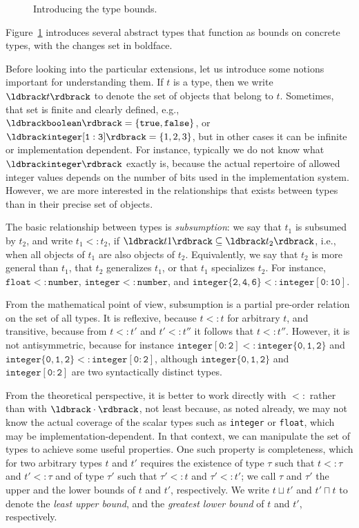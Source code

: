 \documentclass[droidmono,libertine,twoside,user,unofficial]{ecarticle}
\newcommand{\denot}[1]{\ensuremath{\ldbrack#1\rdbrack}}
\begin{document}
\begin{figure}[]
  \caption{Introducing the type bounds.}
  \label{fig:lattice-type-grammar}
\end{figure}

Figure~\ref{fig:lattice-type-grammar} introduces several abstract
types that function as bounds on concrete types, with the changes set in
boldface.

Before looking into the particular extensions, let us introduce some
notions important for understanding them.  If $t$ is a type, then we
write $\denot{t}$ to denote the set of objects that belong to $t$.
Sometimes, that set is finite and clearly defined, e.g.,
$\denot{\mathtt{boolean}} = \{\mathtt{true}, \mathtt{false}\}$, or
$\denot{\mathtt{integer[1:3]}} = \{1, 2, 3\}$, but in other cases it
can be infinite or implementation dependent.  For instance, typically
we do not know what $\denot{\mathtt{integer}}$ exactly is, because the
actual repertoire of allowed integer values depends on the number of
bits used in the implementation system.  However, we are more
interested in the relationships that exists between types than in
their precise set of objects.

The basic relationship between types is \emph{subsumption}: we say
that $t_1$ is subsumed by $t_2$, and write $t_1<:t_2$, if
$\denot{t1}\subseteq \denot{t_2}$, i.e., when all objects of $t_1$ are
also objects of $t_2$.  Equivalently, we say that $t_2$ is more
general than $t_1$, that $t_2$ generalizes $t_1$, or that $t_1$
specializes $t_2$.  For instance, $\mathtt{float}<:\mathtt{number}$,
$\mathtt{integer}<:\mathtt{number}$, and
$\mathtt{integer\{2,4,6\}}<:\mathtt{integer[0:10]}$.

From the mathematical point of view, subsumption is a partial
pre-order relation on the set of all types.  It is reflexive, because
$t<:t$ for arbitrary $t$, and transitive, because from $t<:t'$ and
$t'<:t''$ it follows that $t<:t''$.  However, it is not antisymmetric,
because for instance
$\mathtt{integer[0:2]}<:\mathtt{integer\{0,1,2\}}$ and
$\mathtt{integer\{0,1,2\}}<:\mathtt{integer[0:2]}$, although
$\mathtt{integer\{0,1,2\}}$ and $\mathtt{integer[0:2]}$ are two
syntactically distinct types.

From the theoretical perspective, it is better to work directly with
$<:$ rather than with $\denot{\cdot}$, not least because, as noted
already, we may not know the actual coverage of the scalar types such
as \texttt{integer} or \texttt{float}, which may be
implementation-dependent.  In that context, we can manipulate the set
of types to achieve some useful properties.  One such property is
completeness, which for two arbitrary types $t$ and $t'$ requires the
existence of type $\tau$ such that $t<:\tau$ and $t'<:\tau$ and of
type $\tau'$ such that $\tau'<:t$ and $\tau'<:t'$; we call $\tau$ and
$\tau'$ the upper and the lower bounds of $t$ and $t'$, respectively.
We write $t\sqcup t'$ and $t'\sqcap t$ to denote the \emph{least upper
  bound}, and the \emph{greatest lower bound} of $t$ and $t'$,
respectively.
\end{document}
